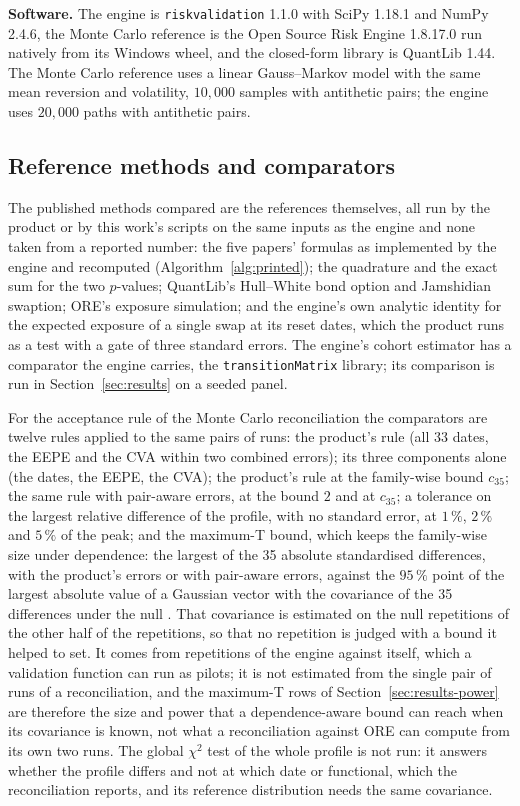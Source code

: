 \textbf{Software.} The engine is \texttt{riskvalidation} 1.1.0 with SciPy 1.18.1 and NumPy 2.4.6, the Monte Carlo reference is the Open Source Risk Engine 1.8.17.0 run natively from its Windows wheel, and the closed-form library is QuantLib 1.44. The Monte Carlo reference uses a linear Gauss--Markov model with the same mean reversion and volatility, $10{,}000$ samples with antithetic pairs; the engine uses $20{,}000$ paths with antithetic pairs.

\subsection{Reference methods and comparators}
\label{sec:design-methods}

The published methods compared are the references themselves, all run by the product or by this work's scripts on the same inputs as the engine and none taken from a reported number: the five papers' formulas as implemented by the engine and recomputed (Algorithm~\ref{alg:printed}); the quadrature and the exact sum for the two $p$-values; QuantLib's Hull--White bond option and Jamshidian swaption; ORE's exposure simulation; and the engine's own analytic identity for the expected exposure of a single swap at its reset dates, which the product runs as a test with a gate of three standard errors. The engine's cohort estimator has a comparator the engine carries, the \texttt{transitionMatrix} library; its comparison is run in Section~\ref{sec:results} on a seeded panel.

For the acceptance rule of the Monte Carlo reconciliation the comparators are twelve rules applied to the same pairs of runs: the product's rule (all $33$ dates, the EEPE and the CVA within two combined errors); its three components alone (the dates, the EEPE, the CVA); the product's rule at the family-wise bound $c_{35}$; the same rule with pair-aware errors, at the bound $2$ and at $c_{35}$; a tolerance on the largest relative difference of the profile, with no standard error, at $1\,\%$, $2\,\%$ and $5\,\%$ of the peak; and the maximum-T bound, which keeps the family-wise size under dependence: the largest of the 35 absolute standardised differences, with the product's errors or with pair-aware errors, against the $95\,\%$ point of the largest absolute value of a Gaussian vector with the covariance of the 35 differences under the null \citep{hothorn2008}. That covariance is estimated on the null repetitions of the other half of the repetitions, so that no repetition is judged with a bound it helped to set. It comes from repetitions of the engine against itself, which a validation function can run as pilots; it is not estimated from the single pair of runs of a reconciliation, and the maximum-T rows of Section~\ref{sec:results-power} are therefore the size and power that a dependence-aware bound can reach when its covariance is known, not what a reconciliation against ORE can compute from its own two runs. The global $\chi^{2}$ test of the whole profile is not run: it answers whether the profile differs and not at which date or functional, which the reconciliation reports, and its reference distribution needs the same covariance.

